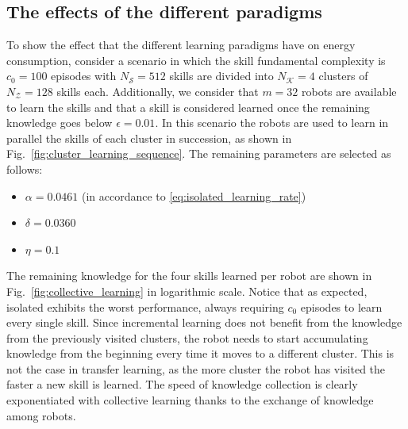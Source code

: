 \subsection{The effects of the different paradigms}
To show the effect that the different learning paradigms have on energy consumption, consider a scenario in which the skill fundamental complexity is $c_0=100$ episodes with $N_\mathcal{S}= 512$  skills are divided into $N_\mathcal{K}=4$ clusters of $N_\mathcal{Z} = 128$ skills each. Additionally, we consider that $m=32$ robots are available to learn the skills and that a skill is considered learned once the remaining knowledge goes below $\epsilon = 0.01$. In this scenario the robots are used to learn in parallel the skills of each cluster in succession, as shown in Fig.~\ref{fig:cluster_learning_sequence}. The remaining parameters are selected as follows:
\begin{itemize}
	\item $\alpha =  0.0461$ (in accordance to \eqref{eq:isolated_learning_rate})
	\item $\delta =  0.0360$
	\item $\eta= 0.1$
\end{itemize} 
The remaining knowledge for the four skills learned per robot are shown in Fig.~\ref{fig:collective_learning} in logarithmic scale. Notice that as expected, isolated exhibits the worst performance, always requiring $c_0$ episodes to learn every single skill. Since incremental learning does not benefit from the knowledge from the previously visited clusters, the robot needs to start accumulating knowledge from the beginning every time it moves to a different cluster. This is not the case in transfer learning, as the more cluster the robot has visited the faster a new skill is learned. The speed of knowledge collection is clearly exponentiated with collective learning thanks to the exchange of knowledge among robots. 

